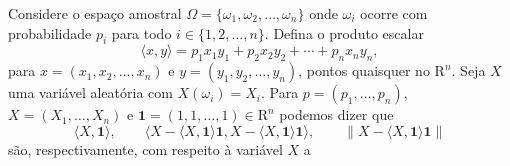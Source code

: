{
\def\AMCbeginQuestion#1#2{\par\noindent{\bf (POSCOMP 2004 - Questão 06)}}
\begin{question}{} Considere o espaço amostral $\Omega=\{\omega_1,\omega_2,\ldots,\omega_n\}$ onde $\omega_i$ ocorre com probabilidade $p_i$ para todo $i\in\{1,2,\ldots,n\}$. Defina o produto escalar
\[
\langle x,y\rangle=p_1x_1y_1+p_2x_2y_2+\cdots+p_nx_ny_n,
\]
para $x=(x_1,x_2,\ldots,x_n)$ e $y=(y_1,y_2,\ldots,y_n)$, pontos quaisquer no $\mathrm{R}^{n}$. Seja $X$ uma variável aleatória com $X(\omega_i)=X_i$. Para $p=(p_1,\ldots,p_n)$, $X=(X_1,\ldots,X_n)$ e $\mathbf{1}=(1,1,\ldots,1)\in\mathrm{R}^{n}$ podemos dizer que
\[
\langle X,\mathbf{1}\rangle,\qquad
\langle X-\langle X,\mathbf{1}\rangle\mathbf{1},X-\langle X,\mathbf{1}\rangle\mathbf{1}\rangle,\qquad
\|X-\langle X,\mathbf{1}\rangle\mathbf{1}\|
\]
são, respectivamente, com respeito à variável $X$ a
\begin{choices}
\end{choices}
\end{question}
}

